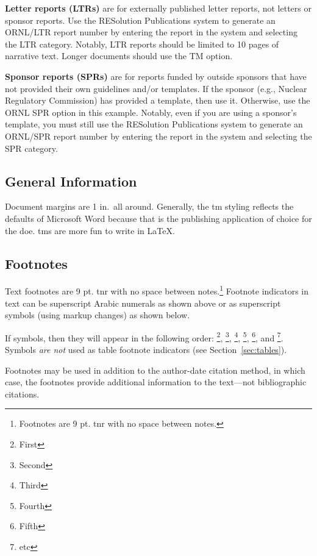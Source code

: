\documentclass[tm]{ornltm} %
\begin{document}
\begin{foreword}
\textbf{Letter reports (LTRs)} are for externally published letter reports, not
letters or sponsor reports. Use the RESolution Publications system to generate
an ORNL/LTR report number by entering the report in the system and selecting the
LTR category. Notably, LTR reports should be limited to 10 pages of narrative
text. Longer documents should use the TM option.

\textbf{Sponsor reports (SPRs)} are for reports funded by outside sponsors that
have not provided their own guidelines and/or templates. If the sponsor (e.g.,
Nuclear Regulatory Commission) has provided a template, then use it. Otherwise,
use the ORNL SPR option in this example. Notably, even if you are using a
sponsor's template, you must still use the RESolution Publications system to
generate an ORNL/SPR report number by entering the report in the system and
selecting the SPR category.

\subsection*{General Information}

Document margins are 1 in.~all around. Generally, the \ac{tm} styling reflects
the defaults of Microsoft Word because that is the publishing application of
choice for the \ac{doe}. \Acp{tm} are more fun to write in \LaTeX.

\subsection*{Footnotes}

Text footnotes are 9 pt. \ac{tnr} with no space between notes.\footnote{Footnotes
are 9 pt. \ac{tnr} with no space between notes.} Footnote indicators in text can be
superscript Arabic numerals as shown above or as superscript symbols
(using markup changes) as shown below.

\renewcommand*{\thefootnote}{\fnsymbol{footnote}}

If symbols, then they will appear in the following order: \footnote{First},
\footnote{Second}, \footnote{Third}, \footnote{Fourth}, \footnote{Fifth}, and
\footnote{etc}. Symbols \emph{are not} used as table footnote indicators (see
Section~\ref{sec:tables}).

\renewcommand*{\thefootnote}{\arabic{footnote}}
\setcounter{footnote}{0}

Footnotes may be used in addition to the author-date citation method, in which
case, the footnotes provide additional information to the text---not
bibliographic citations.
\end{foreword}
\end{document}
